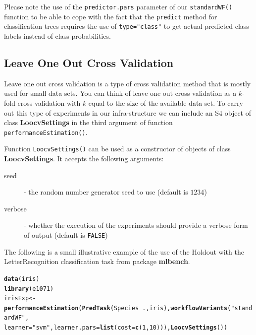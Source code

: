 \documentclass[10pt,a4paper]{article}\usepackage[]{graphicx}\usepackage[]{color}
\makeatletter
\newcommand{\hlnum}[1]{\textcolor[rgb]{0.686,0.059,0.569}{#1}}%
\newcommand{\hlstr}[1]{\textcolor[rgb]{0.192,0.494,0.8}{#1}}%
\newcommand{\hlopt}[1]{\textcolor[rgb]{0,0,0}{#1}}%
\newcommand{\hlstd}[1]{\textcolor[rgb]{0.345,0.345,0.345}{#1}}%
\newcommand{\hlkwb}[1]{\textcolor[rgb]{0.69,0.353,0.396}{#1}}%
\newcommand{\hlkwc}[1]{\textcolor[rgb]{0.333,0.667,0.333}{#1}}%
\newcommand{\hlkwd}[1]{\textcolor[rgb]{0.737,0.353,0.396}{\textbf{#1}}}%
\newenvironment{kframe}{%
 \def\at@end@of@kframe{}%
 \ifinner\ifhmode%
  \def\at@end@of@kframe{\end{minipage}}%
  \begin{minipage}{\columnwidth}%
 \fi\fi%
 \def\FrameCommand##1{\hskip\@totalleftmargin \hskip-\fboxsep
 \colorbox{shadecolor}{##1}\hskip-\fboxsep
     \hskip-\linewidth \hskip-\@totalleftmargin \hskip\columnwidth}%
 \MakeFramed {\advance\hsize-\width
   \@totalleftmargin\z@ \linewidth\hsize
   \@setminipage}}%
 {\par\unskip\endMakeFramed%
 \at@end@of@kframe}
\newenvironment{knitrout}{}{} %
\makeatother
\begin{document}
Please note the use of the \texttt{predictor.pars} parameter of our \texttt{standardWF()} function to be able to cope with the fact that the \texttt{predict} method for classification trees requires the use of \texttt{type="class"} to get actual predicted class labels instead of class probabilities.

\subsection{Leave One Out Cross Validation}

Leave one out cross validation is a type of cross validation method
that is mostly used for small data sets. You can think of leave one
out cross validation as a $k$-fold cross validation with $k$ equal to
the size of the available data set. To carry out this type of
experiments in our infra-structure we can include an S4 object of
class \textbf{LoocvSettings} in the third argument of function
\texttt{performanceEstimation()}.

Function \texttt{LoocvSettings()} can be used as a constructor of
objects of class \textbf{LoocvSettings}. It accepts the following
arguments:

\begin{description}
\item[seed] - the random number generator seed to use (default is $1234$)
\item[verbose] - whether the execution of the experiments should provide a verbose form of output (default is \texttt{FALSE})
\end{description}


The following is a small illustrative example of the use of the
Holdout with the LetterRecognition classification task from package
\textbf{mlbench}.

\begin{knitrout}
\color{fgcolor}\begin{kframe}
\begin{alltt}
\hlkwd{data}\hlstd{(iris)}
\hlkwd{library}\hlstd{(e1071)}
\hlstd{irisExp} \hlkwb{<-} \hlkwd{performanceEstimation}\hlstd{(}\hlkwd{PredTask}\hlstd{(Species} \hlopt{~} \hlstd{., iris),} \hlkwd{workflowVariants}\hlstd{(}\hlstr{"standardWF"}\hlstd{,}
    \hlkwc{learner} \hlstd{=} \hlstr{"svm"}\hlstd{,} \hlkwc{learner.pars} \hlstd{=} \hlkwd{list}\hlstd{(}\hlkwc{cost} \hlstd{=} \hlkwd{c}\hlstd{(}\hlnum{1}\hlstd{,} \hlnum{10}\hlstd{))),} \hlkwd{LoocvSettings}\hlstd{())}
\end{alltt}
\end{kframe}
\end{knitrout}
\end{document}
